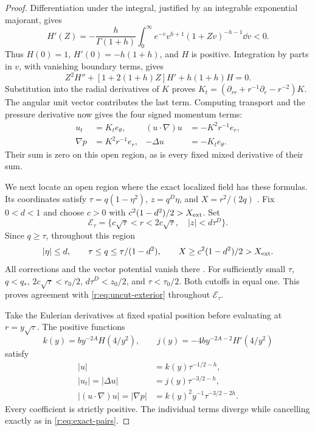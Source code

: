 \begin{proof}
Differentiation under the integral, justified by an integrable exponential
majorant, gives
\[
 H'(Z)=-\frac{h}{\Gamma(1+h)}\int_0^\infty
 e^{-v}v^{h+1}(1+Zv)^{-h-1}\dd v<0.
\]
Thus \(H(0)=1\), \(H'(0)=-h(1+h)\), and \(H\) is positive.
Integration by parts in \(v\), with vanishing boundary terms, gives
\[
 Z^2H''+[1+2(1+h)Z]H'+h(1+h)H=0.
\]
Substitution into the radial derivatives of \(K\) proves
\(K_t=(\partial_{rr}+r^{-1}\partial_r-r^{-2})K\).
The angular unit vector contributes the last term. Computing transport
and the pressure derivative now gives the four signed momentum terms:
\begin{equation}
 \begin{aligned}
 u_t&=K_t e_\theta,&
 (u\cdot\nabla)u&=-K^2r^{-1}e_r,\\
 \nabla p&=K^2r^{-1}e_r,&
 -\Delta u&=-K_t e_\theta.
 \end{aligned}
 \label{r:eq:exact-pairs}
\end{equation}
Their sum is zero on this open region, as is every fixed mixed derivative
of their sum.

We next locate an open region where the exact localized field has these
formulas. Its coordinates satisfy
\(\tau=q(1-\eta^2)\), \(z=q^D\eta\), and \(X=r^2/(2q)\)
\cite[(3.2)]{openai-paper}.
Fix \(0<d<1\) and choose \(c>0\) with
\(c^2(1-d^2)/2>X_{\rm ext}\). Set
\begin{equation}
 \mathcal E_\tau=
 \{c\sqrt\tau<r<2c\sqrt\tau,\quad |z|<d\tau^D\}.
 \label{r:eq:shrinking-annulus}
\end{equation}
Since \(q\ge\tau\), throughout this region
\[
 |\eta|\le d,\qquad
 \tau\le q\le\tau/(1-d^2),\qquad
 X\ge c^2(1-d^2)/2>X_{\rm ext}.
\]
All corrections and the vector potential vanish there
\cite[p.~116, Step~4]{openai-paper}. For sufficiently small \(\tau\),
\(q<q_*\), \(2c\sqrt\tau<r_0/2\),
\(d\tau^D<z_0/2\), and \(\tau<\tau_0/2\).
Both cutoffs in \cite[(10.3)--(10.5)]{openai-paper} equal one.
This proves agreement with \eqref{r:eq:uncut-exterior} throughout
\(\mathcal E_\tau\).

Take the Eulerian derivatives at fixed spatial position before evaluating
at \(r=y\sqrt\tau\). The positive functions
\[
 k(y)=b y^{-2A}H(4/y^2),\qquad
 j(y)=-4b y^{-2A-2}H'(4/y^2)
\]
satisfy
\begin{equation}
 \begin{aligned}
 |u|&=k(y)\tau^{-1/2-h},\\
 |u_t|=|\Delta u|&=j(y)\tau^{-3/2-h},\\
 |(u\cdot\nabla)u|=|\nabla p|
 &=k(y)^2y^{-1}\tau^{-3/2-2h}.
 \end{aligned}
 \label{r:eq:exterior-powers}
\end{equation}
Every coefficient is strictly positive. The individual terms diverge
while cancelling exactly as in \eqref{r:eq:exact-pairs}.


\end{proof}
